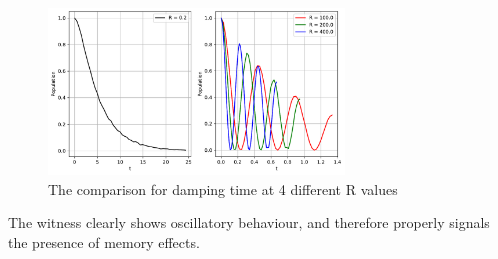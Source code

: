 \documentclass[12pt]{article}
\begin{document}
  \begin{figure}[h]
    \centering
    \includegraphics[width=0.7\textwidth]{images/amplitude_damping_population_non_markovianity}
    \caption{The comparison for damping time at 4 different R values %
            \label{fig:amplitude_damping_population}}
  \end{figure}

  The witness clearly shows oscillatory behaviour, and therefore properly signals the presence of memory effects.


  \printbibliography
\end{document}
